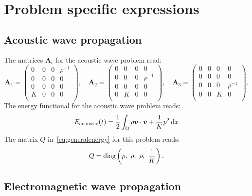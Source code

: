 \documentclass[a4paper]{article}
\renewcommand{\vec}{\boldsymbol}
\begin{document}
\section{Problem specific expressions}
\label{sec:specifics}


\subsection{Acoustic wave propagation}

The matrices $\vec{A}_{i}$ for the acoustic wave problem read:
\begin{equation}
\vec{A}_1 =
\begin{pmatrix}
0 & 0 & 0 & \rho^{-1} \\
0 & 0 & 0 & 0 \\
0 & 0 & 0 & 0 \\
K & 0 & 0 & 0  \\
\end{pmatrix}
, \quad
\vec{A}_2
=
\begin{pmatrix}
0 & 0 & 0 & 0 \\
0 & 0 & 0 & \rho^{-1} \\
0 & 0 & 0 & 0 \\
0 & K & 0 & 0  \\
\end{pmatrix}
,\quad
\vec{A}_3
=
\begin{pmatrix}
0 & 0 & 0 & 0 \\
0 & 0 & 0 & 0 \\
0 & 0 & 0 & \rho^{-1}\\
0 & 0 & K & 0  \\
\end{pmatrix}.
\label{eq:Aacoustic}
\end{equation}
The energy functional for the acoustic wave problem reads:
\begin{equation}
E_\text{acoustic}(t) = \frac{1}{2}\int_{\Omega} \rho \vec{v} \cdot
\vec{v}
+ \frac{1}{K} p^{2} \dif x
\label{eq:acousticenergy}
\end{equation}
The matrix $Q$ in~\eqref{eq:generalenergy} for this problem reads:
\begin{equation}
  Q = \text{diag}\del{\rho, \ \rho, \ \rho, \ \frac{1}{K}}.
\label{eq:Qacoustic}
\end{equation}

\subsection{Electromagnetic wave propagation}
\end{document}
